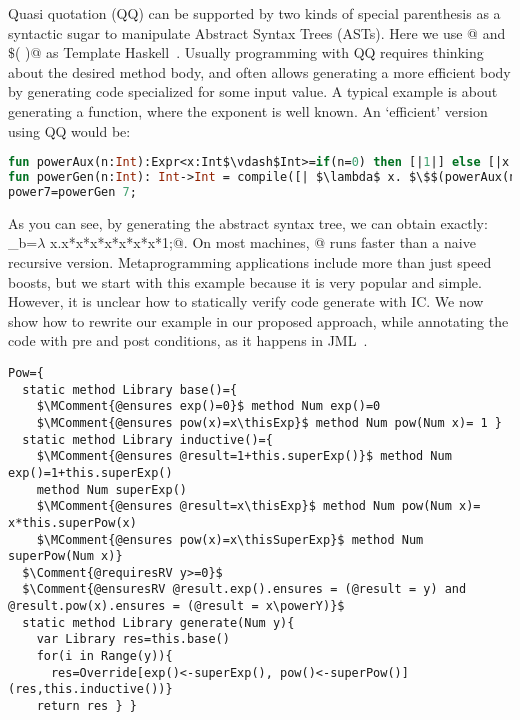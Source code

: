 \documentclass[a4paper,twoside,british,9pt]{extarticle}
\begin{document}
Quasi quotation (QQ) can be supported by two kinds of special parenthesis as a syntactic sugar to manipulate Abstract Syntax Trees (ASTs). Here we use
\Q@[|  |]@  and \Q@$\$$(  )@ as Template Haskell~\cite{sheard2002template}.
Usually programming with QQ requires thinking about the desired method body,
 and often allows generating a more efficient body by generating code specialized for some input value.
A typical example is about generating a \Q@pow@ function, where the exponent is well known.
An `efficient' version using QQ would be:
\vspace{-1ex}
\begin{lstlisting}[language=ML]
fun powerAux(n:Int):Expr<x:Int$\vdash$Int>=if(n=0) then [|1|] else [|x * $\$$(powerAux(n-1)) |];
fun powerGen(n:Int): Int->Int = compile([| $\lambda$ x. $\$$(powerAux(n)) |]);
power7=powerGen 7;
\end{lstlisting}
\vspace{-2ex}
\noindent As you can see, by generating the abstract syntax tree, we can obtain exactly:
_b=$\lambda$ x.x*x*x*x*x*x*x*1;@. On most machines, @ runs faster than a naive recursive version.
Metaprogramming applications include more than just speed boosts, but we start with this example because it is very popular and simple.
However, it is unclear how to statically verify
code generate with IC.
We now show how to rewrite our \Q@pow@ example
in our proposed approach, while annotating the code with pre and post conditions, as it happens in JML~\cite{jml}.
\newcommand\thisExp{\ensuremath{{}^{\textbf{this.exp()}}}}
\newcommand\thisSuperExp{\ensuremath{{}^{\textbf{this.superExp()}}}}
\newcommand\oneThisSuperExp{\ensuremath{{}^{\textbf{1+this.superExp()}}}}
\newcommand\powerY{\ensuremath{{}^{\textbf{y}}}}
\vspace{-1ex}
\begin{lstlisting}[language=FortyTwo]
Pow={
  static method Library base()={
    $\MComment{@ensures exp()=0}$ method Num exp()=0 
    $\MComment{@ensures pow(x)=x\thisExp}$ method Num pow(Num x)= 1 }
  static method Library inductive()={
    $\MComment{@ensures @result=1+this.superExp()}$ method Num exp()=1+this.superExp() 
    method Num superExp()
    $\MComment{@ensures @result=x\thisExp}$ method Num pow(Num x)= x*this.superPow(x)
    $\MComment{@ensures pow(x)=x\thisSuperExp}$ method Num superPow(Num x)}
  $\Comment{@requiresRV y>=0}$
  $\Comment{@ensuresRV @result.exp().ensures = (@result = y) and @result.pow(x).ensures = (@result = x\powerY)}$
  static method Library generate(Num y){
    var Library res=this.base()
    for(i in Range(y)){
      res=Override[exp()<-superExp(), pow()<-superPow()](res,this.inductive())}
    return res } }
\end{lstlisting}
\end{document}
